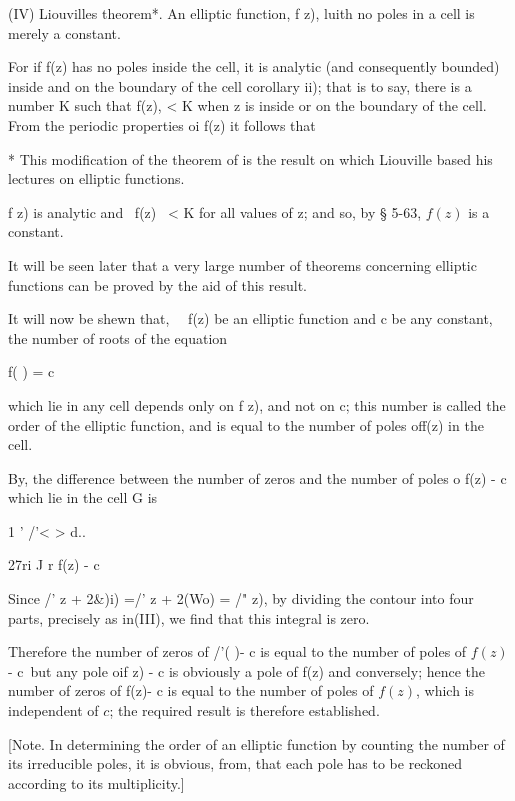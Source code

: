 (IV) Liouvilles theorem*. An elliptic function, f z), luith no poles
in a cell is merely a constant.

For if f(z) has no poles inside the cell, it is analytic (and
consequently bounded) inside and on the boundary of the cell 
corollary ii); that is to say, there is a number K such that f(z), <
K when z is inside or on the boundary of the cell. From the periodic
properties oi f(z) it follows that

* This modification of the theorem of is the result on which
Liouville based his lectures on elliptic functions.

%
%

f z) is analytic and \ f(z) \ < K for all values of z; and so, by §
5-63, $f(z)$ is a constant.

It will be seen later that a very large number of theorems concerning
elliptic functions can be proved by the aid of this result.


It will now be shewn that, \ \ f(z) be an elliptic function and c be
any constant, the number of roots of the equation

f( ) = c

which lie in any cell depends only on f z), and not on c; this number
is called the order of the elliptic function, and is equal to the
number of poles off(z) in the cell.

By, the difference between the number of zeros and the number
of poles o f(z) - c which lie in the cell G is

1 ' /'< > d..

27ri J r f(z) - c

Since /' z + 2\&)i) =/' z + 2(Wo) = /" z), by dividing the contour
into four parts, precisely as in(III), we find that this
integral is zero.

Therefore the number of zeros of /'( )- c is equal to the number of
poles of $f(z)$ - c\ but any pole oif z) - c is obviously a pole of f(z)
and conversely; hence the number of zeros of f(z)- c is equal to the
number of poles of $f(z)$, which is independent of $c$; the required
result is therefore established.

[Note. In determining the order of an elliptic function by counting
the number of its irreducible poles, it is obvious, from, that
each pole has to be reckoned according to its multiplicity.]

